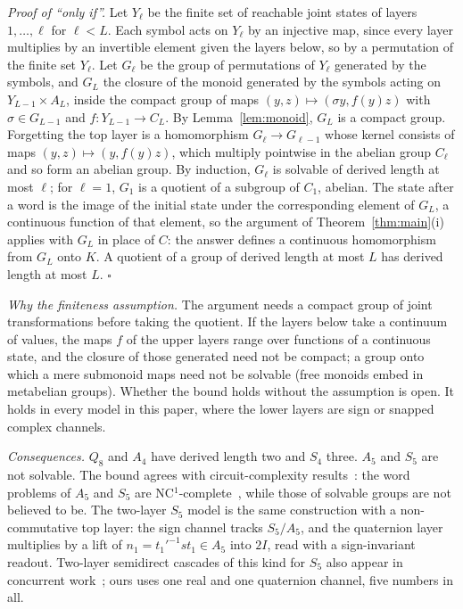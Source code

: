 \documentclass[aps,prx,reprint,superscriptaddress,longbibliography,nofootinbib,floatfix]{revtex4-2}
\theoremstyle{plain}
\theoremstyle{definition}
\begin{document}
\emph{Proof of ``only if''.} Let $Y_\ell$ be the finite set of reachable
joint states of layers $1,\dots,\ell$ for $\ell<L$. Each symbol acts on
$Y_{\ell}$ by an injective map, since every layer multiplies by an
invertible element given the layers below, so by a permutation of the
finite set $Y_\ell$. Let $G_\ell$ be the group of permutations of $Y_\ell$
generated by the symbols, and $G_L$ the closure of the monoid generated by
the symbols acting on $Y_{L-1}\times A_L$, inside the compact group of maps
$(y,z)\mapsto(\sigma y,f(y)z)$ with $\sigma\in G_{L-1}$ and $f\colon
Y_{L-1}\to C_L$. By Lemma~\ref{lem:monoid}, $G_L$ is a compact group.
Forgetting the top layer is a homomorphism $G_\ell\to G_{\ell-1}$ whose
kernel consists of maps $(y,z)\mapsto(y,f(y)z)$, which multiply pointwise
in the abelian group $C_\ell$ and so form an abelian group. By induction,
$G_\ell$ is solvable of derived length at most $\ell$; for $\ell=1$, $G_1$
is a quotient of a subgroup of $C_1$, abelian. The state after a word is the
image of the initial state under the corresponding element of $G_L$, a
continuous function of that element, so the argument of
Theorem~\ref{thm:main}(i) applies with $G_L$ in place of $C$: the answer
defines a continuous homomorphism from $G_L$ onto $K$. A quotient of a
group of derived length at most $L$ has derived length at most $L$.
$\square$

\emph{Why the finiteness assumption.} The argument needs a compact group of
joint transformations before taking the quotient. If the layers below take a
continuum of values, the maps $f$ of the upper layers range over functions
of a continuous state, and the closure of those generated need not be
compact; a group onto which a mere submonoid maps need not be solvable (free
monoids embed in metabelian groups). Whether the bound holds without the
assumption is open. It holds in every model in this paper, where the lower
layers are sign or snapped complex channels.

\emph{Consequences.} $Q_8$ and $A_4$ have derived length two and $S_4$
three. $A_5$ and $S_5$ are not solvable. The bound agrees with
circuit-complexity results~\cite{merrill_illusion,sarrof}: the word problems
of $A_5$ and $S_5$ are NC$^1$-complete~\cite{barrington}, while those of
solvable groups are not believed to be. The two-layer $S_5$ model is the
same construction with a non-commutative top layer: the sign channel tracks
$S_5/A_5$, and the quaternion layer multiplies by a lift of
$n_1=t_1'^{-1}st_1\in A_5$ into $2I$, read with a sign-invariant readout.
Two-layer semidirect cascades of this kind for $S_5$ also appear
in concurrent work~\cite{jia_ncssm}; ours uses one real and one quaternion channel, five
numbers in all.
\end{document}
